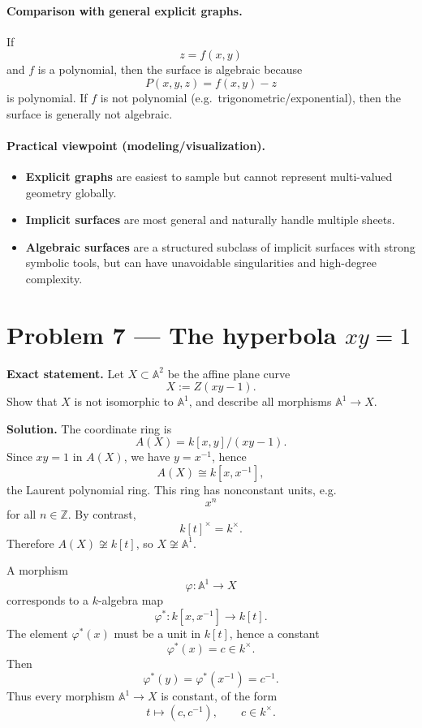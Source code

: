 \documentclass[12pt,a4paper]{article}
\theoremstyle{plain}
\theoremstyle{definition}      %
\begin{document}
\paragraph{Comparison with general explicit graphs.}
If
\[
z=f(x,y)
\]
and $f$ is a polynomial, then the surface is algebraic because
\[
P(x,y,z)=f(x,y)-z
\]
is polynomial.
If $f$ is not polynomial (e.g.\ trigonometric/exponential), then the surface is generally not algebraic.

\paragraph{Practical viewpoint (modeling/visualization).}
\begin{itemize}
	\item \textbf{Explicit graphs} are easiest to sample but cannot represent multi-valued geometry globally.
	\item \textbf{Implicit surfaces} are most general and naturally handle multiple sheets.
	\item \textbf{Algebraic surfaces} are a structured subclass of implicit surfaces with strong symbolic tools, but can have unavoidable singularities and high-degree complexity.
\end{itemize}




\section*{Problem 7 — The hyperbola $xy=1$}

\textbf{Exact statement.}
Let $X\subset \mathbb A^2$ be the affine plane curve
\[
X
:=
Z(xy-1).
\]
Show that $X$ is not isomorphic to $\mathbb A^1$,
and describe all morphisms $\mathbb A^1\to X$.

\textbf{Solution.}
The coordinate ring is
\[
A(X)
=
k[x,y]/(xy-1).
\]
Since $xy=1$ in $A(X)$, we have $y=x^{-1}$, hence
\[
A(X)
\cong
k[x,x^{-1}],
\]
the Laurent polynomial ring.
This ring has nonconstant units, e.g.
\[
x^n
\]
for all $n\in \mathbb Z$.
By contrast,
\[
k[t]^\times
=
k^\times.
\]
Therefore $A(X)\not\cong k[t]$, so $X\not\cong \mathbb A^1$.

A morphism
\[
\varphi:\mathbb A^1\to X
\]
corresponds to a $k$-algebra map
\[
\varphi^*:
k[x,x^{-1}]
\to
k[t].
\]
The element $\varphi^*(x)$ must be a unit in $k[t]$, hence a constant
\[
\varphi^*(x)=c\in k^\times.
\]
Then
\[
\varphi^*(y)
=
\varphi^*(x^{-1})
=
c^{-1}.
\]
Thus every morphism $\mathbb A^1\to X$ is constant, of the form
\[
t
\longmapsto
(c,c^{-1}),
\qquad
c\in k^\times.
\]
\end{document}

